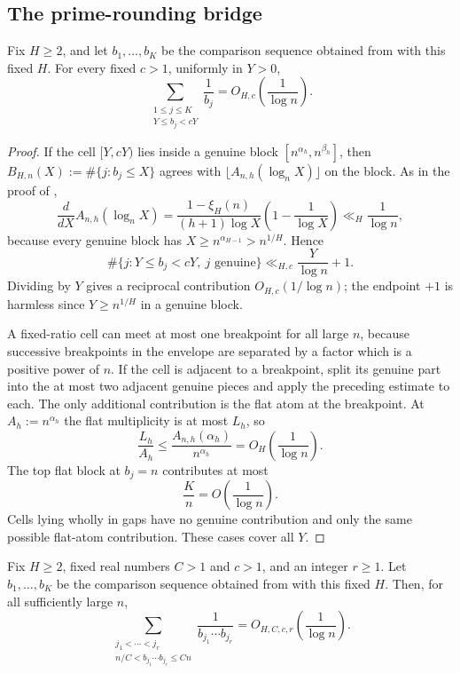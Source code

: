 \subsection{The prime-rounding bridge}

\begin{lemma}\label{lem:cell-reciprocal-mass}
Fix $H\ge2$, and let $b_1,\ldots,b_K$ be the comparison sequence obtained from
 with this fixed $H$.  For every fixed $c>1$,
uniformly in $Y>0$,
\[
  \sum_{\substack{1\le j\le K\\Y\le b_j<cY}}\frac1{b_j}
  =
  O_{H,c}\!\left(\frac1{\log n}\right).
\]
\end{lemma}

\begin{proof}
If the cell $[Y,cY)$ lies inside a genuine block
$[n^{\alpha_h},n^{\beta_h}]$, then $B_{H,n}(X):=\#\{j:b_j\le X\}$ agrees with
$\lfloor A_{n,h}(\log_n X)\rfloor$ on the block.  As in the proof of
,
\[
  \frac{d}{dX}A_{n,h}(\log_n X)
  =
  \frac{1-\xi_H(n)}{(h+1)\log X}
  \left(1-\frac1{\log X}\right)
  \ll_H \frac1{\log n},
\]
because every genuine block has $X\ge n^{\alpha_{H-1}}>n^{1/H}$.  Hence
\[
  \#\{j:Y\le b_j<cY,\ j\text{ genuine}\}
  \ll_{H,c}\frac{Y}{\log n}+1.
\]
Dividing by $Y$ gives a reciprocal contribution $O_{H,c}(1/\log n)$; the
endpoint $+1$ is harmless since $Y\ge n^{1/H}$ in a genuine block.

A fixed-ratio cell can meet at most one breakpoint for all large $n$, because
successive breakpoints in the envelope are separated by a factor which is a
positive power of $n$.  If the cell is adjacent to a breakpoint, split its
genuine part into the at most two adjacent genuine pieces and apply the
preceding estimate to each.  The only additional contribution is the flat atom
at the breakpoint.  At $A_h:=n^{\alpha_h}$ the flat multiplicity is at most
$L_h$, so
\[
  \frac{L_h}{A_h}
  \le
  \frac{A_{n,h}(\alpha_h)}{n^{\alpha_h}}
  =
  O_H\!\left(\frac1{\log n}\right).
\]
The top flat block at $b_j=n$ contributes at most
\[
  \frac{K}{n}=O\!\left(\frac1{\log n}\right).
\]
Cells lying wholly in gaps have no genuine contribution and only the same
possible flat-atom contribution.  These cases cover all $Y$.
\end{proof}

\begin{lemma}
\label{lem:product-strip-reciprocal}
Fix $H\ge2$, fixed real numbers $C>1$ and $c>1$, and an integer $r\ge1$.
Let $b_1,\ldots,b_K$ be the comparison sequence obtained from
 with this fixed $H$.  Then, for all
sufficiently large $n$,
\[
  \sum_{\substack{j_1<\cdots<j_r\\
  n/C<b_{j_1}\cdots b_{j_r}\le Cn}}
  \frac{1}{b_{j_1}\cdots b_{j_r}}
  =
  O_{H,C,c,r}\!\left(\frac1{\log n}\right).
\]
\end{lemma}

